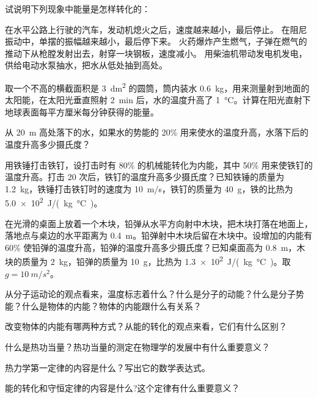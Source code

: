 \begin{Practice}
\begin{question}
	\item 试说明下列现象中能量是怎样转化的：
	\begin{tasks}
		\task 在水平公路上行驶的汽车，发动机熄火之后，速度越来越小，最后停止。
		\task 在阻尼振动中，单摆的振幅越来越小，最后停下来。
		\task 火药爆炸产生燃气，子弹在燃气的推动下从枪膛发射出去，射穿一块钢板，速度减小。
		\task 用柴油机带动发电机发电，供给电动水泵抽水，把水从低处抽到高处。
	\end{tasks}
	\item 取一个不高的横截面积是 \qty{3}{dm^2} 的圆筒，筒内装水 \qty{0.6}{kg}，用来测量射到地面的太阳能，在太阳光垂直照射 \qty{2}{min} 后，水的温度升高了 \qty{1}{\celsius}。计算在阳光直射下地球表面每平方厘米每分钟获得的能量。
	\item 从 \qty{20}{m} 高处落下的水，如果水的势能的 20\% 用来使水的温度升高，水落下后的温度升高多少摄氏度？
	\item 用铁锤打击铁钉，设打击时有 80\% 的机械能转化为内能，其中 50\% 用来使铁钉的温度升高。打击 20 次后，铁钉的温度升高多少摄氏度？已知铁锤的质量为 \qty{1.2}{kg}，铁锤打击铁钉时的速度为 \qty{10}{m/s}，铁钉的质量为 \qty{40}{g}，铁的比热为\qty{5.0e2}{J/(kg.\celsius)}。
	\item 在光滑的桌面上放着一个木块，铅弹从水平方向射中木块，把木块打落在地面上，落地点与桌边的水平距离为 \qty{0.4}{m}。铅弹射中木块后留在木块中。设增加的内能有 60\% 使铅弹的温度升高，铅弹的温度升高多少摄氏度？已知桌面高为 \qty{0.8}{m}，木块的质量为 \qty{2}{kg}，铅弹的质量为 \qty{10}{g}，比热为 \qty{1.3e2}{J/(kg.\celsius)}。取 $g=\qty{10}{m/s^2}$。
\end{question}
\end{Practice}

\begin{Review}
\begin{question}
	\item 从分子运动论的观点看来，温度标志着什么？什么是分子的动能？什么是分子势能？什么是物体的内能？物体的内能跟什么有关系？
	\item 改变物体的内能有哪两种方式？从能的转化的观点来看，它们有什么区别？
	\item 什么是热功当量？热功当量的测定在物理学的发展中有什么重要意义？
	\item 热力学第一定律的内容是什么？写出它的数学表达式。
	\item 能的转化和守恒定律的内容是什么?这个定律有什么重要意义？
\end{question}
\end{Review}
